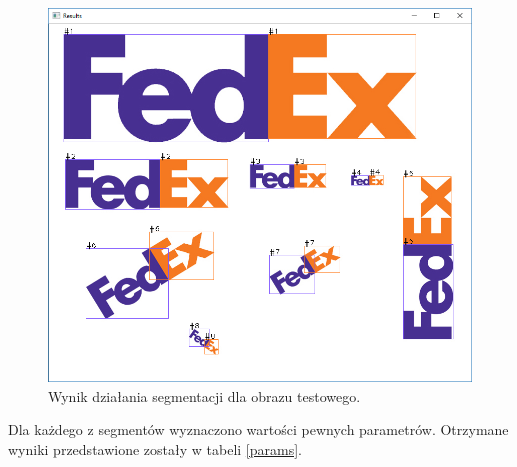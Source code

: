 \documentclass[12pt, oneside, final]{report}
\begin{document}
\begin{figure}[ht!]
	\centering
	\includegraphics[width=\textwidth]{images/test_image.png}
	\caption{Wynik działania segmentacji dla obrazu testowego.}
	\label{test}
\end{figure}

Dla każdego z segmentów wyznaczono wartości pewnych parametrów. Otrzymane wyniki przedstawione zostały w tabeli \ref{params}.
\end{document}
